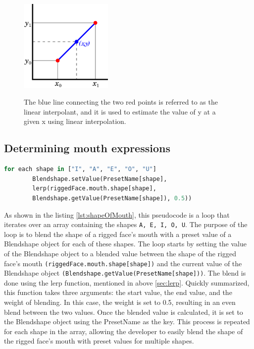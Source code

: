 \begin{figure}[htb]
  \centering
  \includegraphics[width=0.4\textwidth]{pics/lerp.png}
  \caption{The blue line connecting the two red points is referred to as the linear interpolant, and it is used to estimate the value of y at a given x using linear interpolation.}
  \cite{angles}
  \label{fig:lerp}
\end{figure}

\subsection{Determining mouth expressions}

\begin{lstlisting}[language=Python,caption=Shape of mouth,label=lst:shapeOfMouth]
    for each shape in ["I", "A", "E", "O", "U"]
        Blendshape.setValue(PresetName[shape], 
        lerp(riggedFace.mouth.shape[shape], 
        Blendshape.getValue(PresetName[shape]), 0.5))

\end{lstlisting}
As shown in the listing \ref{lst:shapeOfMouth}, this pseudocode is a loop that iterates over an array containing the shapes \texttt{A, E, I, O, U}. 
The purpose of the loop is to blend the shape of a rigged face's mouth with a preset value of a 
Blendshape object for each of these shapes. The loop starts by setting the value of the Blendshape 
object to a blended value between the shape of the rigged face's mouth \texttt{(riggedFace.mouth.shape[shape])}
and the current value of the Blendshape object \texttt{(Blendshape.getValue(PresetName[shape]))}. 
The blend is done using the lerp function, mentioned in above \ref{sec:lerp}. 
Quickly summarized, this function takes three arguments: the start value, the end value, and the weight of blending. 
In this case, the weight is set to 0.5, resulting in an even blend between the two values.
Once the blended value is calculated, it is set to the Blendshape object using the PresetName 
as the key. This process is repeated for each shape in the array, allowing the developer to 
easily blend the shape of the rigged face's mouth with preset values for multiple shapes.

